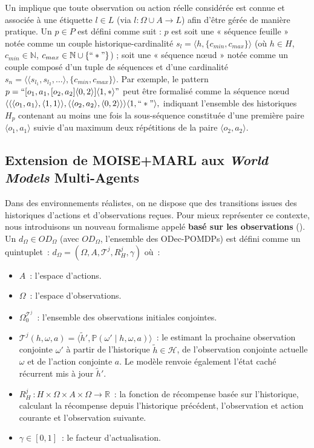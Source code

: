 Un  implique que toute observation ou action réelle considérée est connue et associée à une étiquette \(l \in L\) (via \(l: \Omega \cup A \to L\)) afin d'être gérée de manière pratique. Un  \(p \in P\) est défini comme suit : \(p\) est soit une « séquence feuille » notée comme un couple historique-cardinalité \(s_l = \langle h, \{c_{min}, c_{max}\} \rangle\) (où \(h \in H\), \(c_{min} \in \mathbb{N}\), \(c_{max} \in \mathbb{N} \cup \{``*"\}\)) ; soit une « séquence nœud » notée comme un couple composé d'un tuple de séquences et d'une cardinalité \(s_n = \langle \langle s_{l_1}, s_{l_2}, \dots \rangle, \{c_{min}, c_{max}\} \rangle\). Par exemple, le pattern
$
  p = ``[o_1,a_1,[o_2,a_2]\langle0,2\rangle]\langle1,*\rangle"
$
peut être formalisé comme la séquence nœud
$
  \langle \langle \langle o_1,a_1\rangle,\langle 1,1 \rangle \rangle, \langle \langle o_2,a_2\rangle,\langle 0,2 \rangle \rangle \rangle \langle 1,``*"\rangle,
$
indiquant l'ensemble des historiques \(H_p\) contenant au moins une fois la sous-séquence constituée d'une première paire \(\langle o_1,a_1\rangle\) suivie d'au maximum deux répétitions de la paire \(\langle o_2,a_2\rangle\).

\subsection{Extension de MOISE+MARL aux \textit{World Models} Multi-Agents}

\noindent Dans des environnements réalistes, on ne dispose que des transitions issues des historiques d'actions et d'observations reçues. Pour mieux représenter ce contexte, nous introduisons un nouveau formalisme appelé \textbf{ basé sur les observations} (). Un  $d_\Omega \in OD_\Omega$ (avec $OD_\Omega$, l'ensemble des ODec-POMDPs) est défini comme un quintuplet~:
%
$d_\Omega = \left(\Omega, A, \mathcal{T}^j, R^j_H, \gamma \right)$
%
où~:
\begin{itemize}
  \item $A$~: l'espace d'actions.
  \item $\Omega$~: l'espace d'observations.
  \item $\Omega^{\mathcal{T}^j}_0$~: l'ensemble des observations initiales conjointes.
  \item $\mathcal{T}^j(h, \omega, a) = \langle \tilde{h}', \mathbb{P}(\omega' \mid h, \omega, a) \rangle$~: le  estimant la prochaine observation conjointe $\omega'$ à partir de l'historique $\tilde{h} \in \mathcal{H}$, de l'observation conjointe actuelle $\omega$ et de l'action conjointe $a$. Le modèle renvoie également l'état caché récurrent mis à jour $\tilde{h}'$.
  \item $R^j_H~: H \times \Omega \times A \times \Omega \rightarrow \mathbb{R}$~: la fonction de récompense basée sur l'historique, calculant la récompense depuis l'historique précédent, l'observation et action courante et l'observation suivante.
  \item $\gamma \in [0, 1]$~: le facteur d'actualisation.
\end{itemize}

